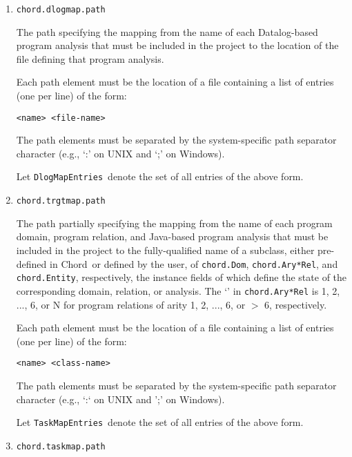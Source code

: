 \documentclass{article}
\providecommand\Chord{{Chord}}
\providecommand\TaskMapEntries{{\tt TaskMapEntries}}
\providecommand\DlogMapEntries{{\tt DlogMapEntries}}
\begin{document}
\begin{enumerate}
\item
{\tt chord.dlogmap.path}

The path specifying the mapping from the name of each Datalog-based program
analysis that must be included in the project to the location
of the file defining that program analysis.

Each path element must be the location of a file containing a
list of entries (one per line) of the form:

{\tt <name> <file-name>}

The path elements must be separated by the system-specific path separator
character (e.g., `:' on UNIX and `;' on Windows).

Let \DlogMapEntries\ denote the set of all entries of the
above form.

\item
{\tt chord.trgtmap.path}

The path partially specifying the mapping from the name of each program domain,
program relation, and Java-based program analysis that must be
included in the project to the fully-qualified name of a subclass, either
pre-defined in \Chord\ or defined by the user, of {\tt chord.Dom},
{\tt chord.Ary*Rel}, and
{\tt chord.Entity}, respectively, the instance fields of which define the
state of the corresponding domain, relation, or analysis.
The `{\tt *}' in {\tt chord.Ary*Rel} is 1, 2, ..., 6, or N for
program relations of arity 1, 2, ..., 6, or $>$ 6, respectively.

Each path element must be the location of a file containing a
list of entries (one per line) of the form:

{\tt <name> <class-name>}

The path elements must be separated by the system-specific path separator
character (e.g., `:` on UNIX and ';' on Windows).

Let \TaskMapEntries\ denote the set of all entries of the
above form.

\item
{\tt chord.taskmap.path}


\end{enumerate}
\end{document}
